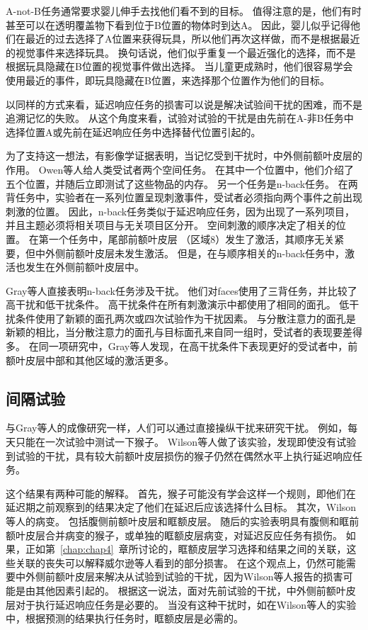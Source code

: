 A-not-B任务通常要求婴儿伸手去找他们看不到的目标。
值得注意的是，他们有时甚至可以在透明覆盖物下看到位于B位置的物体时到达A\cite{butterworth1977object}。
因此，婴儿似乎记得他们在最近的过去选择了A位置来获得玩具，所以他们再次这样做，而不是根据最近的视觉事件来选择玩具。
换句话说，他们似乎重复一个最近强化的选择，而不是根据玩具隐藏在B位置的视觉事件做出选择。
当儿童更成熟时，他们很容易学会使用最近的事件，即玩具隐藏在B位置，来选择那个位置作为他们的目标。


以同样的方式来看，延迟响应任务的损害可以说是解决试验间干扰的困难，而不是追溯记忆的失败。
从这个角度来看，试验对试验的干扰是由先前在A-非B任务中选择位置A或先前在延迟响应任务中选择替代位置引起的。


为了支持这一想法，有影像学证据表明，当记忆受到干扰时，中外侧前额叶皮层的作用。
Owen等人\cite{owen1999redefining}给人类受试者两个空间任务。
在其中一个位置中，他们介绍了五个位置，并随后立即测试了这些物品的内存。
另一个任务是n-back任务。
在两背任务中，实验者在一系列位置呈现刺激事件，受试者必须指向两个事件之前出现刺激的位置。
因此，n-back任务类似于延迟响应任务，因为出现了一系列项目，并且主题必须将相关项目与无关项目区分开。
空间刺激的顺序决定了相关的位置。
在第一个任务中，尾部前额叶皮层 （区域8）发生了激活，其顺序无关紧要，但中外侧前额叶皮层未发生激活。
但是，在与顺序相关的n-back任务中，激活也发生在外侧前额叶皮层中。


Gray等人\cite{gray2003neural}直接表明n-back任务涉及干扰。
他们对faces使用了三背任务，并比较了高干扰和低干扰条件。
高干扰条件在所有刺激演示中都使用了相同的面孔。
低干扰条件使用了新颖的面孔两次或四次试验作为干扰因素。
与分散注意力的面孔是新颖的相比，当分散注意力的面孔与目标面孔来自同一组时，受试者的表现要差得多。
在同一项研究中，Gray等人发现，在高干扰条件下表现更好的受试者中，前额叶皮层中部和其他区域的激活更多。



\subsection{间隔试验}

与Gray等人\cite{gray2003neural}的成像研究一样，人们可以通过直接操纵干扰来研究干扰。
例如，每天只能在一次试验中测试一下猴子。
Wilson等人\cite{wilson1963effect}做了该实验，发现即使没有试验到试验的干扰，具有较大前额叶皮层损伤的猴子仍然在偶然水平上执行延迟响应任务。


这个结果有两种可能的解释。
首先，猴子可能没有学会这样一个规则，即他们在延迟期之前观察到的结果决定了他们在延迟后应该选择什么目标。
其次，Wilson等人的病变。
包括腹侧前额叶皮层和眶额皮层。
随后的实验表明具有腹侧和眶前额叶皮层合并病变的猴子\cite{passingham1971behavioural}，或单独的眶额皮层病变\cite{meunier1997effects}，对延迟反应任务有损伤。
如果，正如第~\ref{chap:chap4}~章所讨论的，眶额皮层学习选择和结果之间的关联，这些关联的丧失可以解释威尔逊等人看到的部分损害。
在这个观点上，仍然可能需要中外侧前额叶皮层来解决从试验到试验的干扰，因为Wilson等人报告的损害可能是由其他因素引起的。
根据这一说法，面对先前试验的干扰，中外侧前额叶皮层对于执行延迟响应任务是必要的。
当没有这种干扰时，如在Wilson等人的实验中，根据预测的结果执行任务时，眶额皮层是必需的。



